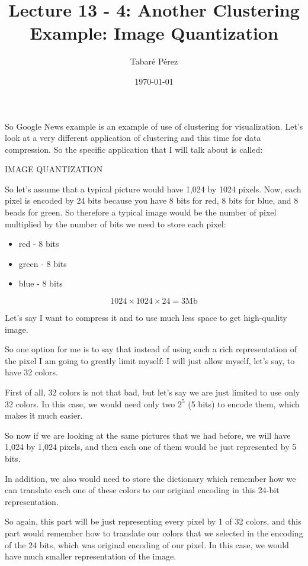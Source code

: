\documentclass[a4paper, 12pt]{article}
\author{Tabaré Pérez}
\date{\today}
\title{Lecture 13 - 4: Another Clustering Example: Image Quantization}
\begin{document}
\maketitle
So Google News example is an example of use of clustering for visualization.
Let's look at a very different application of clustering and this time for data
compression. So the specific application that I will talk about is called:

IMAGE QUANTIZATION

So let's assume that a typical picture would have 1,024 by 1024 pixels. Now,
each pixel is encoded by 24 bits because you have 8 bits for red, 8 bits for
blue, and 8 beads for green. So therefore a typical image would be the number of
pixel multiplied by the number of bits we need to store each pixel:

\begin{itemize}
\item red - 8 bits
\item green - 8 bits
\item blue - 8 bits
\end{itemize}

\begin{equation} 
1024 \times 1024 \times 24 = \text{3Mb}
\end{equation}

Let's say I want to compress it and to use much less space to get high-quality
image.

So one option for me is to say that instead of using such a rich representation
of the pixel I am going to greatly limit myself: I will just allow myself, let's
say, to have 32 colors.

First of all, 32 colors is not that bad, but let's say we are just limited to
use only 32 colors. In this case, we would need only two \(2^5\) (5 bits) to
encode them, which makes it much easier.

So now if we are looking at the same pictures that we had before, we will have
1,024 by 1,024 pixels, and then each one of them would be just represented by 5
bits.

In addition, we also would need to store the dictionary which remember how
we can translate each one of these colors to our original encoding in this
24-bit representation.

So again, this part will be just representing every pixel by 1 of 32 colors, and
this part would remember how to translate our colors that we selected in the
encoding of the 24 bits, which was original encoding of our pixel. In this
case, we would have much smaller representation of the image.
\end{document}

